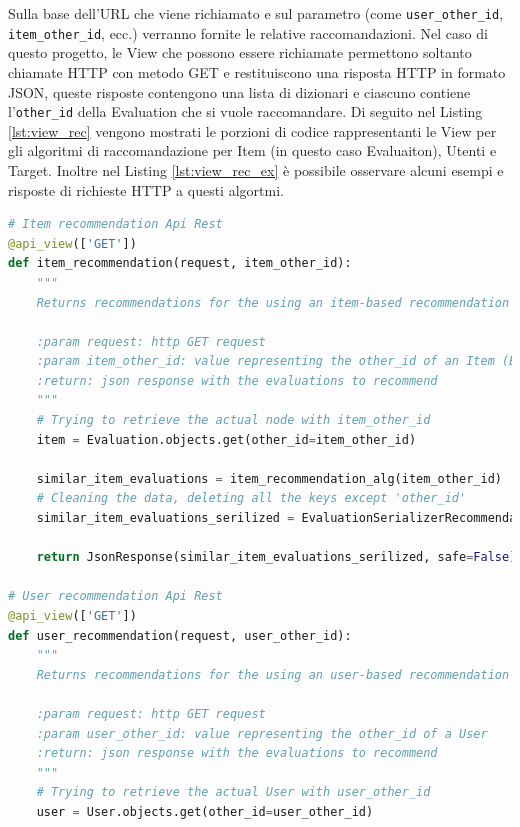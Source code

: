 Sulla base dell'URL che viene richiamato e sul parametro (come \texttt{user\_other\_id}, \texttt{item\_other\_id}, ecc.) verranno fornite le 
relative raccomandazioni. Nel caso di questo progetto, le View che possono essere richiamate permettono soltanto chiamate HTTP con metodo GET 
e restituiscono una risposta HTTP in formato JSON, queste risposte contengono una lista di dizionari e ciascuno contiene l'\texttt{other\_id} della Evaluation 
che si vuole raccomandare. Di seguito nel Listing \ref{lst:view_rec} vengono mostrati le porzioni di codice rappresentanti 
le View per gli algoritmi di raccomandazione per Item (in questo caso Evaluaiton), Utenti e Target. Inoltre nel Listing \ref{lst:view_rec_ex} è 
possibile osservare alcuni esempi e risposte di richieste HTTP a questi algortmi.\hfill\break
\lstset{style=python_code_style}
\begin{lstlisting}[language=Python, label=lst:view_rec, caption={Porzione parziale del codice contenuto nelle View per implementare
    i sistemi di raccomandazione.}]
# Item recommendation Api Rest
@api_view(['GET'])
def item_recommendation(request, item_other_id):
    """
    Returns recommendations for the using an item-based recommendation algorithm for the Evaluation `item_other_id`
 
    :param request: http GET request
    :param item_other_id: value representing the other_id of an Item (Evaluation)
    :return: json response with the evaluations to recommend
    """
    # Trying to retrieve the actual node with item_other_id
    item = Evaluation.objects.get(other_id=item_other_id)
 
    similar_item_evaluations = item_recommendation_alg(item_other_id)
    # Cleaning the data, deleting all the keys except 'other_id'
    similar_item_evaluations_serilized = EvaluationSerializerRecommendation(similar_item_evaluations, many=True).data
 
    return JsonResponse(similar_item_evaluations_serilized, safe=False)
 
# User recommendation Api Rest
@api_view(['GET'])
def user_recommendation(request, user_other_id):
    """
    Returns recommendations for the using an user-based recommendation algorithm for the user `user_other_id`
 
    :param request: http GET request
    :param user_other_id: value representing the other_id of a User
    :return: json response with the evaluations to recommend
    """
    # Trying to retrieve the actual User with user_other_id
    user = User.objects.get(other_id=user_other_id)
 

\end{lstlisting}
